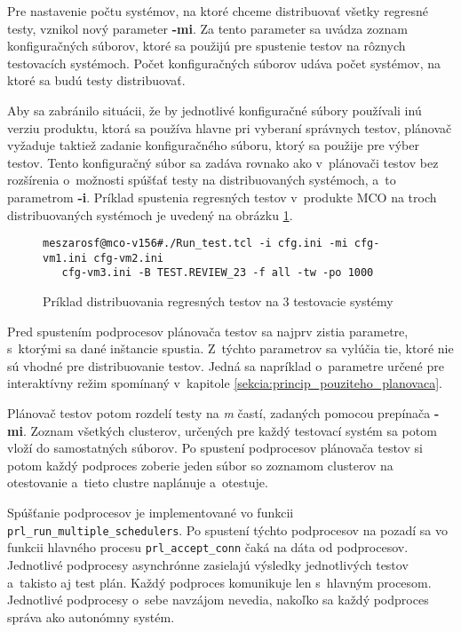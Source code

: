 Pre nastavenie počtu systémov, na ktoré chceme distribuovať všetky 
regresné testy, vznikol nový parameter \textbf{-mi}.
Za tento parameter sa uvádza zoznam konfiguračných súborov, ktoré sa 
použijú pre spustenie testov na rôznych testovacích systémoch. 
Počet konfiguračných súborov udáva počet systémov, na ktoré sa budú 
testy distribuovať.

Aby sa zabránilo situácii, že by jednotlivé konfiguračné súbory používali 
inú verziu produktu, ktorá sa používa hlavne pri vyberaní správnych testov, 
plánovač vyžaduje taktiež zadanie konfiguračného súboru, ktorý
sa použije pre výber testov. 
Tento konfiguračný súbor sa zadáva rovnako ako v~plánovači testov 
bez rozšírenia o~možnosti spúšťať testy na distribuovaných systémoch, 
a~to parametrom \textbf{-i}.
Príklad spustenia regresných testov v~produkte MCO na troch distribuovaných 
systémoch je uvedený na obrázku 
\ref{obrazok:priklad_spustania_testov_paralelne}.

\begin{figure}[h]
\begin{lstlisting}
meszarosf@mco-v156#./Run_test.tcl -i cfg.ini -mi cfg-vm1.ini cfg-vm2.ini 
   cfg-vm3.ini -B TEST.REVIEW_23 -f all -tw -po 1000
\end{lstlisting}
\caption{Príklad distribuovania regresných testov na 3 testovacie systémy}
\label{obrazok:priklad_spustania_testov_paralelne}
\end{figure}

Pred spustením podprocesov plánovača testov sa najprv zistia parametre, 
s~ktorými sa dané  inštancie spustia. 
Z~týchto parametrov sa vylúčia tie, ktoré nie sú vhodné pre
distribuovanie testov. Jedná sa napríklad o~parametre určené pre 
interaktívny režim spomínaný v~kapitole 
\ref{sekcia:princip_pouziteho_planovaca}.

Plánovač testov potom rozdelí testy na \textit{m} častí, zadaných pomocou 
prepínača \textbf{-mi}. Zoznam všetkých clusterov, určených pre každý 
testovací systém sa potom vloží do samostatných súborov.
Po spustení podprocesov plánovača testov si potom každý podproces zoberie 
jeden súbor so zoznamom clusterov na otestovanie a~tieto clustre 
naplánuje a~otestuje.

Spúšťanie podprocesov je implementované vo funkcii 
\texttt{prl\_run\_multiple\_schedulers}.
Po spustení týchto podprocesov na pozadí sa vo funkcii hlavného procesu 
\texttt{prl\_accept\_conn} čaká na dáta od podprocesov.
Jednotlivé podprocesy asynchrónne zasielajú výsledky jednotlivých testov 
a~takisto aj test plán. Každý podproces komunikuje len s~hlavným procesom. 
Jednotlivé podprocesy o~sebe navzájom nevedia, nakoľko sa každý podproces 
správa ako autonómny systém. 


